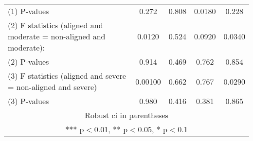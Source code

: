 \begin{tabular}{lcccc}
(1) \hspace{1mm} P-values & 0.272 & 0.808 & 0.0180 & 0.228 \\
(2) F statistics (aligned and moderate = non-aligned and moderate): & 0.0120 & 0.524 & 0.0920 & 0.0340 \\
(2) \hspace{1mm} P-values & 0.914 & 0.469 & 0.762 & 0.854 \\
(3) F statistics (aligned and severe = non-aligned and severe) & 0.00100 & 0.662 & 0.767 & 0.0290 \\
 (3) \hspace{1mm} P-values & 0.980 & 0.416 & 0.381 & 0.865 \\ \hline
\multicolumn{5}{c}{ Robust ci in parentheses} \\
\multicolumn{5}{c}{ *** p$<$0.01, ** p$<$0.05, * p$<$0.1} \\
\end{tabular}
